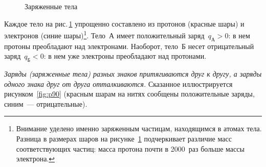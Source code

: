 \documentclass[main.tex]{subfiles}
\begin{document}
\begin{NoHyper}
\begin{figure}[H]
\caption{Заряженные тела}
\label{fig:p89}
\end{figure}

Каждое тело на рис.\,\ref{fig:p89} упрощенно составлено из протонов (красные шары) и электронов (синие шары)\footnote{Внимание уделено именно заряженным частицам, находящимся в атомах тела. Разница в размерах шаров на рисунке~\ref{fig:p89} подчеркивает различие масс соответствующих частиц: масса протона почти в 2000~раз больше массы электрона.}. Тело~А имеет положительный заряд~$q_\text{А}>0$: в нем протоны преобладают над электронами. Наоборот, тело~Б несет отрицательный заряд~$q_\text{Б}<0$: в нем уже электроны преобладают над протонами. 


\emph{Заряды (заряженные тела) разных знаков притягиваются друг к другу, а заряды одного знака друг от друга отталкиваются.} Сказанное иллюстрируется рисунком~\ref{fig:p90} (красным шарам на нитях сообщены положительные заряды, синим~--- отрицательные).

    \begin{figure}[H]
    \centering


\end{figure}
\end{NoHyper}
\end{document}
